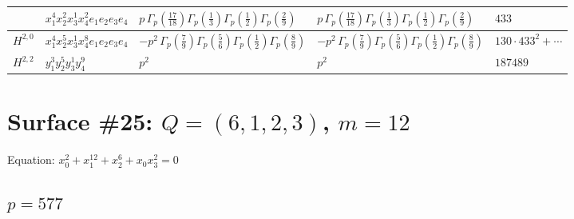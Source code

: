 \documentclass[11pt]{article}
\begin{document}
\begin{table}[ht]
{\begin{tabular}{@{}lllll@{}}
 & $x_{1}^{4} x_{2}^{2} x_{3}^{1} x_{4}^{2}  e_{1} e_{2} e_{3} e_{4}$ & $p \, \Gamma_p \left( \frac{17}{18} \right) \Gamma_p \left( \frac{1}{3} \right) \Gamma_p \left( \frac{1}{2} \right) \Gamma_p \left( \frac{2}{9} \right)$ & $p \, \Gamma_p \left( \frac{17}{18} \right) \Gamma_p \left( \frac{1}{3} \right) \Gamma_p \left( \frac{1}{2} \right) \Gamma_p \left( \frac{2}{9} \right)$ & $433$ \\
\midrule
$H^{2,0}$ & $x_{1}^{4} x_{2}^{5} x_{3}^{1} x_{4}^{8}  e_{1} e_{2} e_{3} e_{4}$ & $- p^{2} \, \Gamma_p \left( \frac{7}{9} \right) \Gamma_p \left( \frac{5}{6} \right) \Gamma_p \left( \frac{1}{2} \right) \Gamma_p \left( \frac{8}{9} \right)$ & $- p^{2} \, \Gamma_p \left( \frac{7}{9} \right) \Gamma_p \left( \frac{5}{6} \right) \Gamma_p \left( \frac{1}{2} \right) \Gamma_p \left( \frac{8}{9} \right)$ & $130{\cdot}433^{2}{+}\cdots$ \\
\midrule
$H^{2,2}$ & $y_{1}^{3} y_{2}^{5} y_{3}^{1} y_{4}^{9}$ & $p^{2} \,$ & $p^{2} \,$ & $187489$ \\
\bottomrule
\end{tabular}
}
\renewcommand{\arraystretch}{1.0}
\end{table}

\newpage

\section*{Surface \#25: $Q=(6, 1, 2, 3)$, $m=12$}

Equation: $x_0^{2} + x_1^{12} + x_2^{6} + x_0 x_3^{2} = 0$

\subsection*{$p = 577$}
\end{document}
